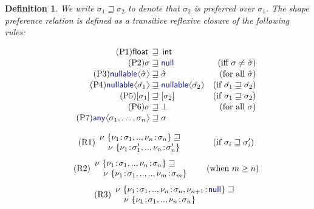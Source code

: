 \documentclass[10pt,preprint,blind,clearpagebib]{sigplanconf}
\newcommand{\langl}{\begin{picture}(4.5,7)
\put(1.1,2.5){\rotatebox{60}{\line(1,0){5.5}}}
\put(1.1,2.5){\rotatebox{300}{\line(1,0){5.5}}}
\end{picture}}
\newcommand{\rangl}{\begin{picture}(4.5,7)
\put(.9,2.5){\rotatebox{120}{\line(1,0){5.5}}}
\put(.9,2.5){\rotatebox{240}{\line(1,0){5.5}}}
\end{picture}}
\newcommand{\kvd}[1]{\textnormal{\textcolor{kvdclr}{\sffamily #1}}}
\newcommand{\ident}[1]{\textnormal{\sffamily #1}}
\newtheorem{definition}{Definition}
\begin{document}
\begin{definition}
We write $\sigma_1 \sqsupseteq \sigma_2$ to denote that $\sigma_2$ is preferred over $\sigma_1$. 
The shape preference relation is defined as a transitive reflexive closure of the following rules:

\noindent
\begin{align}
  \label{eq:sub-prim}\tag{P1}
  \ident{float}\,&\sqsupseteq\,\ident{int}&\\[-0.2em]
  \label{eq:sub-null}\tag{P2}
  \sigma &\sqsupseteq \kvd{null}  &(\textnormal{iff}~\sigma \neq \hat{\sigma})  \\[-0.2em]
  \label{eq:sub-opt}\tag{P3}
  \kvd{nullable}\langl\hat{\sigma}\rangl &\sqsupseteq \hat{\sigma}  &(\textnormal{for all}~\hat{\sigma})\\[-0.2em]
  \label{eq:sub-opt-cov}\tag{P4}
  \kvd{nullable}\langl\hat{\sigma_1}\rangl &\sqsupseteq 
    \kvd{nullable}\langl\hat{\sigma_2}\rangl  &(\textnormal{if}~\hat{\sigma_1} \sqsupseteq \hat{\sigma_2})\\[-0.2em]
  \label{eq:sub-col}\tag{P5}
  [\sigma_1] &\sqsupseteq [\sigma_2]  &(\textnormal{if}~\sigma_1 \sqsupseteq \sigma_2) \\[-0.2em]
  \label{eq:sub-bot}\tag{P6}
  \sigma &\sqsupseteq \bot  &(\textnormal{for all}~\sigma)\\[-0.2em]
  \label{eq:sub-var-top}\tag{P7}
  \kvd{any}\langl \sigma_1, \ldots, \sigma_n\rangl &\sqsupseteq \sigma 
\end{align}
\vspace{-2em}

\noindent
\begin{align}
\label{eq:sub-record1}\tag{R1}
\begin{array}{l}
 \nu~\{ \nu_1\!:\!\sigma_1, .., \nu_n\!:\!\sigma_n \} \sqsupseteq \\
 \quad\nu~\{ \nu_1\!:\!\sigma_1', .., \nu_n\!:\!\sigma_n' \}
\end{array} \qquad ~~~~(\textnormal{if}~\sigma_i \sqsupseteq \sigma_i')
\end{align}
\vspace{-1.5em}
\begin{align}
\label{eq:sub-record2}\tag{R2}
\begin{array}{l}
 \nu~\{ \nu_1\!:\!\sigma_1, .., \nu_n\!:\!\sigma_n \} \sqsupseteq \\
 \quad\nu~\{ \nu_1\!:\!\sigma_1, .., .., \nu_m\!:\!\sigma_m \}
\end{array} \quad~~\, (\textnormal{when}~m \geq n)
\end{align}
\vspace{-1.5em}
\begin{align}
\label{eq:sub-record3}\tag{R3}
\begin{array}{l}
 \nu~\{ \nu_1\!:\!\sigma_1, .., \nu_n\!:\!\sigma_n, \nu_{n+1}\!:\!\kvd{null} \} \sqsupseteq \\
 \quad\nu~\{ \nu_1\!:\!\sigma_1, .., \nu_n\!:\!\sigma_n \}
\end{array}
\end{align}
\end{definition}
\end{document}
